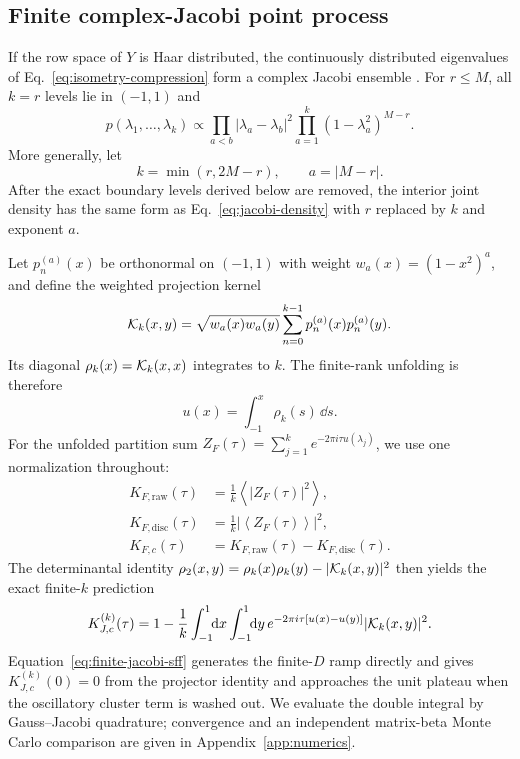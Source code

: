 \subsection{Finite complex-Jacobi point process}

If the row space of \(Y\) is Haar distributed, the continuously distributed
eigenvalues of Eq.~\eqref{eq:isometry-compression} form a complex Jacobi
ensemble \cite{zyczkowski2000,collins2005}.
For \(r\leq M\), all \(k=r\) levels lie in \((-1,1)\) and
\begin{equation}
 p(\lambda_1,\ldots,\lambda_k)\propto
 \prod_{a<b}|\lambda_a-\lambda_b|^2
 \prod_{a=1}^{k}(1-\lambda_a^2)^{M-r}.
 \label{eq:jacobi-density}
\end{equation}
More generally, let
\begin{equation}
 k=\min(r,2M-r),\qquad a=|M-r| .
 \label{eq:jacobi-parameters}
\end{equation}
After the exact boundary levels derived below are removed, the interior joint
density has the same form as Eq.~\eqref{eq:jacobi-density} with \(r\) replaced
by \(k\) and exponent \(a\).

Let \(p_n^{(a)}(x)\) be orthonormal on \((-1,1)\) with weight
\(w_a(x)=(1-x^2)^a\), and define the weighted projection kernel
\begin{equation}
 {\cal K}_k(x,y)=\sqrt{w_a(x)w_a(y)}
 \sum_{n=0}^{k-1}p_n^{(a)}(x)p_n^{(a)}(y).
 \label{eq:jacobi-kernel}
\end{equation}
Its diagonal \(\rho_k(x)={\cal K}_k(x,x)\) integrates to \(k\).
The finite-rank unfolding is therefore
\begin{equation}
 u(x)=\int_{-1}^{x}\rho_k(s)\,\dd s .
 \label{eq:finite-unfolding}
\end{equation}
For the unfolded partition sum
\(Z_F(\tau)=\sum_{j=1}^{k}e^{-2\pi i\tau u(\lambda_j)}\), we use one
normalization throughout:
\begin{equation}
 \begin{aligned}
 K_{F,\mathrm{raw}}(\tau)
 &=\frac{1}{k}\left\langle |Z_F(\tau)|^2\right\rangle,\\
 K_{F,\mathrm{disc}}(\tau)
 &=\frac{1}{k}\left|\left\langle Z_F(\tau)\right\rangle\right|^2,\\
 K_{F,c}(\tau)&=K_{F,\mathrm{raw}}(\tau)
 -K_{F,\mathrm{disc}}(\tau).
 \end{aligned}
 \label{eq:sff-conventions}
\end{equation}
The determinantal identity
\(\rho_2(x,y)=\rho_k(x)\rho_k(y)-|{\cal K}_k(x,y)|^2\) then yields the exact
finite-\(k\) prediction
\begin{equation}
 K_{J,c}^{(k)}(\tau)
 =1-\frac{1}{k}\int_{-1}^{1}\!\!\mathrm{d} x\int_{-1}^{1}\!\!\mathrm{d} y\,
 e^{-2\pi i\tau[u(x)-u(y)]}|{\cal K}_k(x,y)|^2 .
 \label{eq:finite-jacobi-sff}
\end{equation}
Equation~\eqref{eq:finite-jacobi-sff} generates the finite-\(D\) ramp directly
and gives
\(K_{J,c}^{(k)}(0)=0\) from the projector identity and approaches the unit
plateau when the oscillatory cluster term is washed out.
We evaluate the double integral by Gauss--Jacobi quadrature; convergence and
an independent matrix-beta Monte Carlo comparison are given in
Appendix~\ref{app:numerics}.

